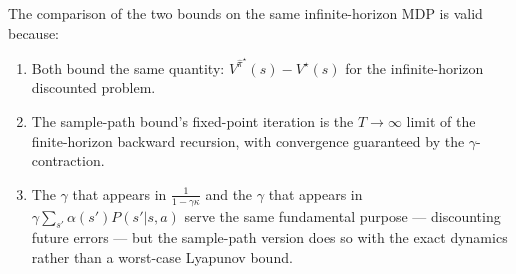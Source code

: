 \documentclass[11pt]{article}
\newcommand{\pihatstar}{\hat\pi^\star}
\newcommand{\Vstar}{V^\star}
\newcommand{\Vpihat}{V^{\pihatstar}}
\begin{document}
\bigskip
The comparison of the two bounds on the same infinite-horizon MDP is valid
because:
\begin{enumerate}
  \item Both bound the same quantity: $\Vpihat(s) - \Vstar(s)$ for the
        infinite-horizon discounted problem.
  \item The sample-path bound's fixed-point iteration is the $T \to \infty$
        limit of the finite-horizon backward recursion, with convergence
        guaranteed by the $\gamma$-contraction.
  \item The $\gamma$ that appears in $\frac{1}{1-\gamma\kappa}$ and the
        $\gamma$ that appears in $\gamma \sum_{s'} \alpha(s') P(s'|s,a)$ serve
        the same fundamental purpose --- discounting future errors --- but the
        sample-path version does so with the exact dynamics rather than a
        worst-case Lyapunov bound.
\end{enumerate}
\end{document}
